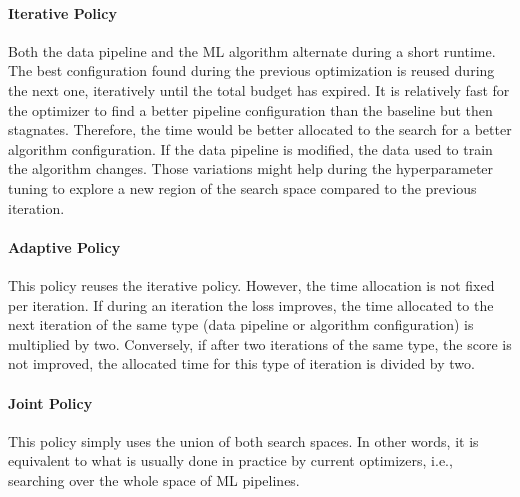 \paragraph{Iterative Policy}
Both the data pipeline and the ML algorithm alternate during a short runtime.
The best configuration found during the previous optimization is reused during the next one, iteratively until the total budget has expired.
It is relatively fast for the optimizer to find a better pipeline configuration than the baseline but then stagnates.
Therefore, the time would be better allocated to the search for a better algorithm configuration.
If the data pipeline is modified, the data used to train the algorithm changes.
Those variations might help during the hyperparameter tuning to explore a new region of the search space compared to the previous iteration.

\paragraph{Adaptive Policy}
This policy reuses the iterative policy.
However, the time allocation is not fixed per iteration.
If during an iteration the loss improves, the time allocated to the next iteration of the same type (data pipeline or algorithm configuration) is multiplied by two.
Conversely, if after two iterations of the same type, the score is not improved, the allocated time for this type of iteration is divided by two.

\paragraph{Joint Policy}
This policy simply uses the union of both search spaces.
In other words, it is equivalent to what is usually done in practice by current optimizers, i.e., searching over the whole space of ML pipelines.


